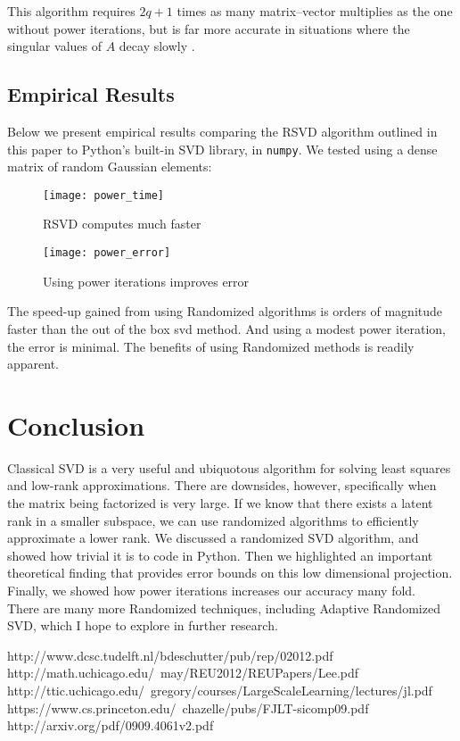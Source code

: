 \documentclass{article}
\begin{document}
This algorithm requires $2q + 1$ times as many matrix–vector multiplies as the one without power iterations, but is far more accurate in situations where the singular values of $A$ decay slowly \cite{martinsson}. 

\subsection{Empirical Results}

Below we present empirical results comparing the RSVD algorithm outlined in this paper to Python's built-in SVD library, in \verb|numpy|. We tested using a dense matrix of random Gaussian elements:

\begin{figure}[ht]
\centering
\begin{minipage}[b]{0.45\linewidth}
\texttt{[image: power\_time]}
\caption{RSVD computes much faster}
\label{fig:minipage1}
\end{minipage}
\quad
\begin{minipage}[b]{0.45\linewidth}
\texttt{[image: power\_error]}
\caption{Using power iterations improves error}
\label{fig:minipage2}
\end{minipage}
\end{figure}

The speed-up gained from using Randomized algorithms is orders of magnitude faster than the out of the box svd method. And using a modest power iteration, the error is minimal. The benefits of using Randomized methods is readily apparent.

\section{Conclusion}

Classical SVD is a very useful and ubiquotous algorithm for solving least squares and low-rank approximations. There are downsides, however, specifically when the matrix being factorized is very large. If we know that there exists a latent rank in a smaller subspace, we can use randomized algorithms to efficiently approximate a lower rank. We discussed a randomized SVD algorithm, and showed how trivial it is to code in Python. Then we highlighted an important theoretical finding that provides error bounds on this low dimensional projection. Finally, we showed how power iterations increases our accuracy many fold.\\

There are many more Randomized techniques, including Adaptive Randomized SVD, which I hope to explore in further research. 

{\footnotesize
\begin{thebibliography}{5} 
 http://www.dcsc.tudelft.nl/bdeschutter/pub/rep/02012.pdf
 http://math.uchicago.edu/~may/REU2012/REUPapers/Lee.pdf
 http://ttic.uchicago.edu/~gregory/courses/LargeScaleLearning/lectures/jl.pdf
 https://www.cs.princeton.edu/~chazelle/pubs/FJLT-sicomp09.pdf
 http://arxiv.org/pdf/0909.4061v2.pdf
\end{thebibliography}
}
\end{document}
